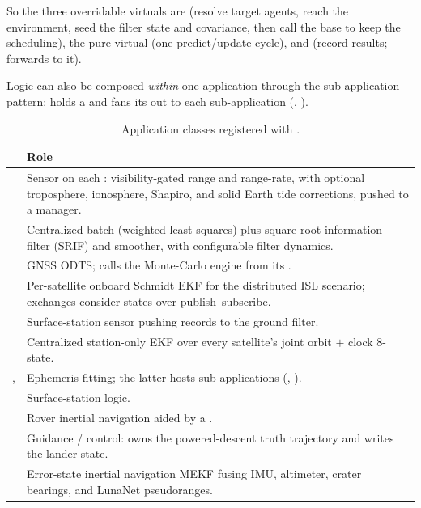 So the three overridable virtuals are  (resolve target agents, reach
the environment, seed the filter state and covariance, then call the base to keep
the scheduling), the pure-virtual  (one predict/update cycle),
and  (record results;  forwards to it).

Logic can also be composed \emph{within} one application through the sub-application
pattern:  holds a  and fans
its  out to each sub-application (,
).

\begin{table}[H]
  \centering
  \caption{Application classes registered with .}
  \label{tab:sim-app-classes}
  \begin{tabularx}{\textwidth}{@{}l L@{}}
    \toprule
     & Role \\
    \midrule
     & Sensor on each :
      visibility-gated range and range-rate, with optional troposphere,
      ionosphere, Shapiro, and solid Earth tide corrections, pushed to a manager. \\
     & Centralized batch (weighted least squares) plus
      square-root information filter (SRIF) and smoother, with configurable filter
      dynamics. \\
     & GNSS ODTS; calls the Monte-Carlo engine from its
      . \\
     & Per-satellite onboard Schmidt EKF for the distributed
      ISL scenario; exchanges consider-states over publish--subscribe. \\
     & Surface-station sensor pushing
       records to the ground filter. \\
     & Centralized station-only EKF over every satellite's joint
      orbit $+$ clock 8-state. \\
    ,  & Ephemeris fitting; the latter hosts
      sub-applications (, ). \\
     & Surface-station logic. \\
     & Rover inertial navigation aided by a
      . \\
     & Guidance / control: owns the powered-descent truth
      trajectory and writes the lander state. \\
     & Error-state inertial navigation MEKF fusing IMU,
      altimeter, crater bearings, and LunaNet pseudoranges. \\
    \bottomrule
  \end{tabularx}
\end{table}

